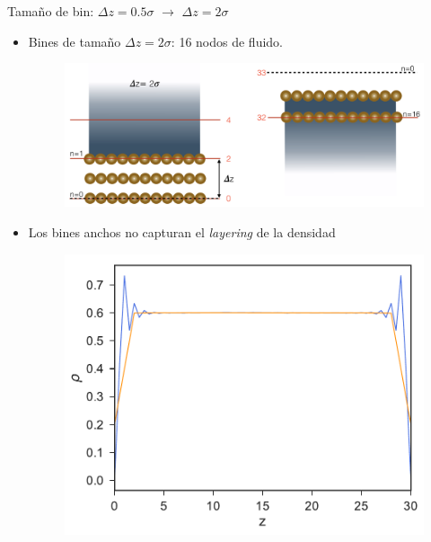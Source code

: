 \documentclass{beamer}
\begin{document}
\begin{frame}{Tamaño de bin: $\Delta z=0.5\sigma$ $\rightarrow$ $\Delta z=2\sigma$}
  \begin{itemize}
\item<1-> Bines de tamaño $\Delta z = 2\sigma$: 16 nodos de fluido. 
\begin{figure}[h!]
\includegraphics[width=0.75\linewidth]{bin_size-top-bottom_17nodos_cut}
\end{figure}
\item<2-> Los bines anchos no capturan el \textit{layering} de la densidad
\begin{figure}[h!]
\includegraphics[width=0.48\linewidth]{DensityProfile-WALLS}
\end{figure}
  \end{itemize}
\end{frame}

\end{document}
